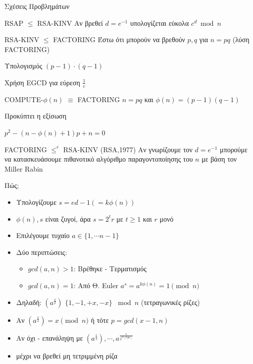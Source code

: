 \documentclass[handout]{beamer}
\begin{document}
\begin{frame}[allowframebreaks]{Σχέσεις Προβλημάτων}

\begin{block}{RSAP $\leq$ RSA-KINV}
Αν βρεθεί $d=e^{-1}$ υπολογίζεται εύκολα $c^d \bmod n$ 
\end{block}

\begin{block}{RSA-KINV $\leq$ FACTORING}
Έστω ότι μπορούν να βρεθούν $p,q$ για $n=pq$ (λύση FACTORING)

Υπολογισμός $(p-1) \cdot (q-1)$

Χρήση EGCD για εύρεση $\frac{1}{e}$
\end{block}

\framebreak

\begin{block}{COMPUTE-$\phi(n)$ $\equiv$ FACTORING}
$n=pq$ και $\phi(n) = (p-1)(q-1)$

Προκύπτει η εξίσωση 

$p^2 - (n- \phi(n) +1)p + n=0$
\end{block}

\begin{block}{FACTORING $\leq^r$ RSA-KINV (RSA,1977)} 
Αν γνωρίζουμε τον $d=e^{-1}$ μπορούμε να κατασκευάσουμε πιθανοτικό αλγόριθμο παραγοντοποίησης του  $n$ με βάση τον Miller Rabin
\end{block}

\framebreak

Πώς;
\begin{itemize}
\item Υπολογίζουμε $s = ed -1 (=k\phi(n))$
\item $\phi(n),s$ είναι ζυγοί, άρα $s = 2^tr$ με $t \geq 1$ και $r$ μονό
\item Επιλέγουμε τυχαίο $a \in \{1, \cdots n-1 \}$
\item Δύο περιπτώσεις:
\begin{itemize}
    \item $gcd(a,n) > 1$: Βρέθηκε - Τερματισμός
    \item $gcd(a,n) =1$: Από Θ. Euler $a^s =a^ {k\phi(n)} =  1 \pmod n$
\end{itemize}
\item Δηλαδή: $(a^\frac{s}{2})$ \in $\{ 1,-1,+x,-x \}$ $\bmod n$ (τετραγωνικές ρίζες)
\item Αν $(a^\frac{s}{2}) = x \pmod n$ ή τότε $p=gcd(x-1,n)$
\item Αν όχι - επανάληψη με $(a^\frac{s}{4}), \cdots, a^\frac{s}{2^{O(logn)}}$
\item μέχρι να βρεθεί μη τετριμμένη ρίζα
\end{itemize}
 
\end{frame}
\end{document}
